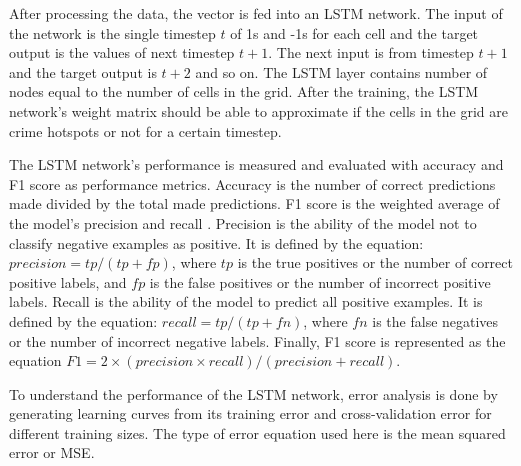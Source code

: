 After processing the data, the vector is fed into an LSTM network. The input of the network is the single timestep $t$ of 1s and -1s for each cell and the target output is the values of next timestep $t+1$. The next input is from timestep $t+1$ and the target output is $t+2$ and so on. The LSTM layer contains number of nodes equal to the number of cells in the grid. After the training, the LSTM network's weight matrix should be able to approximate if the cells in the grid are crime hotspots or not for a certain timestep.

The LSTM network's performance is measured and evaluated with accuracy and F1 score as performance metrics. Accuracy is the number of correct predictions made divided by the total made predictions. F1 score is the weighted average of the model's precision and recall \citep{scikit-learn}. Precision is the ability of the model not to classify negative examples as positive. It is defined by the equation: \( precision = tp / (tp + fp) \), where $tp$ is the true positives or the number of correct positive labels, and $fp$ is the false positives or the number of incorrect positive labels. Recall is the ability of the model to predict all positive examples. It is defined by the equation: \( recall = tp / (tp + fn) \), where $fn$ is the false negatives or the number of incorrect negative labels. Finally, F1 score is represented as the equation \(F1 = 2 \times (precision \times recall) / (precision + recall)\).

To understand the performance of the LSTM network, error analysis is done by generating learning curves from its training error and cross-validation error for different training sizes. The type of error equation used here is the mean squared error or MSE.